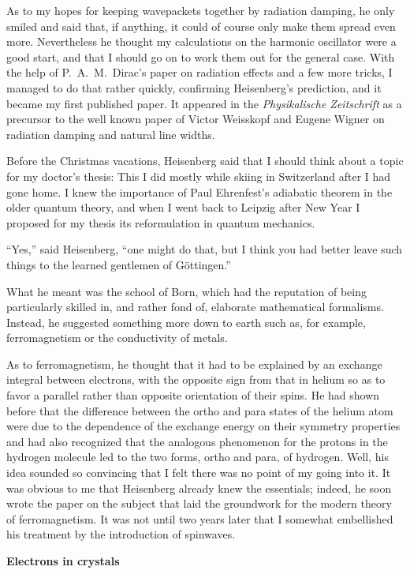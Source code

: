 \documentclass[12pt]{article}
\begin{document}
As to my hopes for keeping wavepackets together by radiation damping, he only smiled and said that, if anything, it could of course only make them spread even more. Nevertheless he thought my calculations on the harmonic oscillator were a good start, and that I should go on to work them out for the general case. With the help of P.~A.~M.~Dirac's paper on radiation effects and a few more tricks, I managed to do that rather quickly, confirming Heisenberg's prediction, and it became my first published paper. It appeared in the {\it Physikalische Zeitschrift} as a precursor to the well known paper of Victor Weisskopf and Eugene Wigner on radiation damping and natural line widths.

Before the Christmas vacations, Heisenberg said that I should think about a topic for my doctor's thesis: This I did mostly while skiing in Switzerland after I had gone home. I knew the importance of Paul Ehrenfest's adiabatic theorem in the older quantum theory, and when I went back to Leipzig after New Year I proposed for my thesis its reformulation in quantum mechanics.

``Yes,'' said Heisenberg, ``one might do that, but I think you had better leave such things to the learned gentlemen of G\"ottingen.''

What he meant was the school of Born, which had the reputation of being particularly skilled in, and rather fond of, elaborate mathematical formalisms. Instead, he suggested something more
down to earth such as, for example, ferromagnetism or the conductivity of metals.

As to ferromagnetism, he thought that it had to be explained by an exchange integral between electrons, with the opposite sign from that in helium so as to favor a parallel rather than opposite orientation of their spins. He had shown before that the difference between the ortho and para states of the helium atom were due to the dependence of the exchange energy on their symmetry properties and had also recognized that the analogous phenomenon for the protons in the hydrogen molecule led to the two forms, ortho and para, of hydrogen. Well, his idea sounded so convincing that I felt there was no point of my going into it. It was obvious to me that Heisenberg already knew the essentials; indeed, he soon wrote the paper on the subject that laid the groundwork for the modern theory of ferromagnetism. It was not until two years later that I somewhat embellished his treatment by the introduction of spinwaves.

\bigskip
\noindent
{\bf Electrons in crystals}
\end{document}
